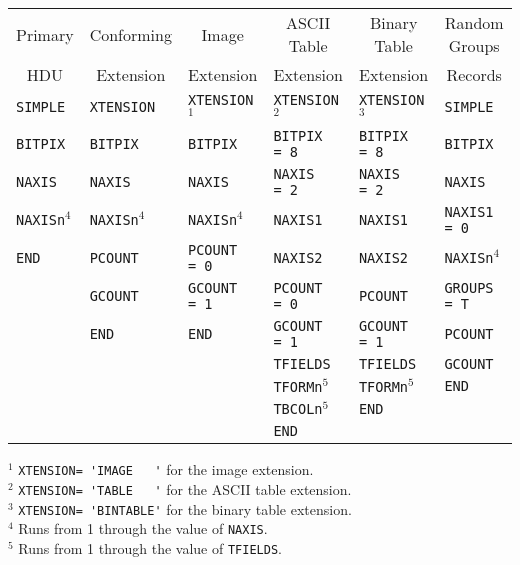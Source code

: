 \documentclass[11pt,makeidx]{book}     %
\begin{document}
\begin{table}[htpb]
\begin{center}
 
\begin{tabular}{llllll} \\ \hline \hline
\multicolumn{1}{c}{Primary}  & \multicolumn{1}{c}{Conforming}     & \multicolumn{1}{c}{Image} &\multicolumn{1}{c}{ASCII Table} & 
\multicolumn{1}{c}{Binary Table}&\multicolumn{1}{c}{Random Groups} \\ 
\multicolumn{1}{c}{HDU}        & \multicolumn{1}{c}{Extension}    & \multicolumn{1}{c}{Extension}   & \multicolumn{1}{c}{Extension}   &
\multicolumn{1}{c}{Extension}& \multicolumn{1}{c}{Records}\\ 
\hline
{\tt SIMPLE}        & {\tt XTENSION}      & {\tt XTENSION}$^{1}$ & {\tt XTENSION}$^{2}$  & {\tt XTENSION}$^{3}$ & {\tt SIMPLE}    \\
{\tt BITPIX}        & {\tt BITPIX}        & {\tt BITPIX}         & {\verb+BITPIX  = 8+}  & {\verb+BITPIX  = 8+} & {\tt BITPIX} \\
{\tt NAXIS}         & {\tt NAXIS}         & {\tt NAXIS}          & {\verb+NAXIS   = 2+}  & {\verb+NAXIS   = 2+} & {\tt NAXIS} \\
{\tt NAXISn}$^{4}$  & {\tt NAXISn}$^{4}$  & {\tt NAXISn}$^{4}$   & {\tt NAXIS1}          & {\tt NAXIS1}         & {\verb+NAXIS1  = 0+} \\
{\tt END }          & {\tt PCOUNT}        & {\verb+PCOUNT  = 0+} & {\tt NAXIS2}          & {\tt NAXIS2}         & {\tt NAXISn}$^{4}$ \\
                    & {\tt GCOUNT}        & {\verb+GCOUNT  = 1+} & {\verb+PCOUNT  = 0+}  & {\tt PCOUNT}         & {\verb+GROUPS  = T+} \\
                    & {\tt END}           & {\tt END}            & {\verb+GCOUNT  = 1+}  & {\verb+GCOUNT  = 1+} & {\tt PCOUNT}   \\
                    &                     &                      & {\tt TFIELDS}         & {\tt TFIELDS}        & {\tt GCOUNT}     \\
                    &                     &                      & {\tt TFORMn}$^{5}$    & {\tt TFORMn}$^{5}$   & {\tt END}       \\
                    &                     &                      & {\tt TBCOLn}$^{5}$    & {\tt END}            &                \\
                    &                     &                      & {\tt END}             &                      &                \\ \hline
\end{tabular}
\end{center}
$^1$ \verb+XTENSION= 'IMAGE   '+ for the 
   image extension. \\
$^2$ \verb+XTENSION= 'TABLE   '+ for the 
    ASCII table extension. \\
$^3$ \verb+XTENSION= 'BINTABLE'+ for the binary table
   extension.\\
$^4$ Runs from 1 through the value of {\tt NAXIS}.\\
$^5$ Runs from 1 through the value of {\tt TFIELDS}.


\end{table}
\end{document}
